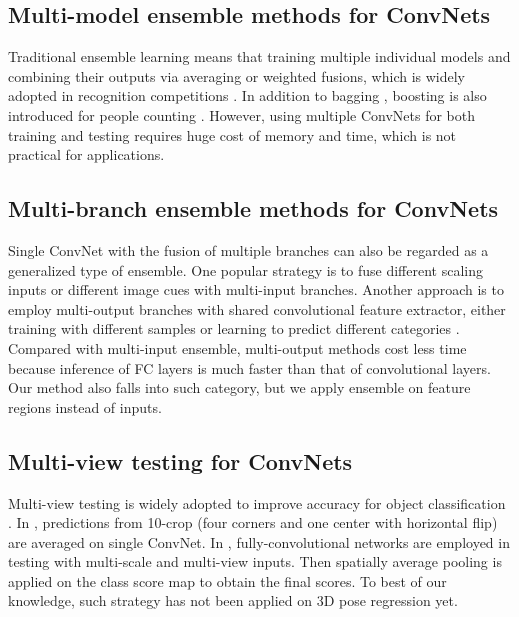 \documentclass[10pt,twocolumn,letterpaper]{article}
\begin{document}
\subsection{Multi-model ensemble methods for ConvNets}
Traditional ensemble learning means that training multiple individual models and combining their outputs via averaging or weighted fusions, which is widely adopted in recognition competitions \cite{krizhevsky2012imagenet}. In addition to bagging \cite{krizhevsky2012imagenet} \cite{sun2013deep}, boosting is also introduced for people counting \cite{walach2016learning}. However, using multiple ConvNets for both training and testing requires huge cost of memory and time, which is not practical for applications.

\subsection{Multi-branch ensemble methods for ConvNets}
Single ConvNet with the fusion of multiple branches can also be regarded as a generalized type of ensemble. One popular strategy is to fuse different scaling inputs \cite{tompson2014real} \cite{oberweger2015hands} or different image cues \cite{guo2016two} \cite{li2016deeptrack} \cite{chen2016accurate} with multi-input branches. Another approach is to employ multi-output branches with shared convolutional feature extractor, either training with different samples \cite{li2016convolutional} or learning to predict different categories \cite{ahmed2016network}. Compared with multi-input ensemble, multi-output methods cost less time because inference of FC layers is much faster than that of convolutional layers. Our method also falls into such category, but we apply ensemble on feature regions instead of inputs.

\subsection{Multi-view testing for ConvNets}
Multi-view testing is widely adopted to improve accuracy for object classification \cite{krizhevsky2012imagenet} \cite{sermanet2013overfeat} \cite{he2014spatial}. In \cite{krizhevsky2012imagenet}, predictions from 10-crop (four corners and one center with horizontal flip) are averaged on single ConvNet. In \cite{sermanet2013overfeat} \cite{he2014spatial}, fully-convolutional networks are employed in testing with multi-scale and multi-view inputs. Then spatially average pooling is applied on the class score map to obtain the final scores. To best of our knowledge, such strategy has not been applied on 3D pose regression yet.
\end{document}
